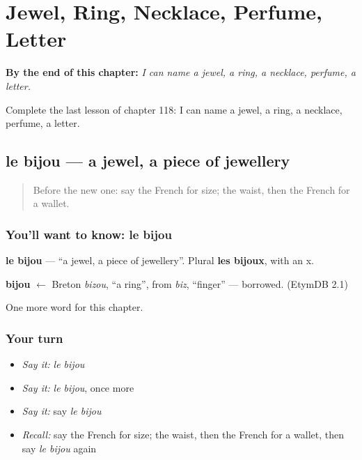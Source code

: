 
\chapter{Jewel, Ring, Necklace, Perfume, Letter}
\label{ch:fr-jewel-ring-necklace-perfume-letter}

\begin{chapteropening}
\textbf{By the end of this chapter:} \emph{I can name a jewel, a ring, a necklace, perfume, a letter.}

Complete the last lesson of chapter 118: I can name a jewel, a ring, a necklace, perfume, a letter.
\end{chapteropening}

\section[le bijou]{le bijou — a jewel, a piece of jewellery}

\label{lesson:FR-C118-bijou}



\begin{quote}
Before the new one: say the French for size; the waist, then the French for a wallet.
\end{quote}

\subsection*{You'll want to know: le bijou}
\textbf{le bijou} — \textquotedblleft{}a jewel, a piece of jewellery\textquotedblright{}. Plural \textbf{les bijoux}, with an x.

\begin{cousinweb}
\textbf{bijou} $\leftarrow$ Breton \emph{bizou}, \textquotedblleft{}a ring\textquotedblright{}, from \emph{biz}, \textquotedblleft{}finger\textquotedblright{} — borrowed. (EtymDB 2.1)
\end{cousinweb}

\begin{grammarlens}[title={What you've built}]
One more word for this chapter.
\end{grammarlens}

\subsection*{Your turn}
\begin{itemize}
\raggedright
  \item \emph{Say it:} \emph{le bijou}
  \item \emph{Say it:} \emph{le bijou}, once more
  \item \emph{Say it:} say \emph{le bijou}
  \item \emph{Recall:} say the French for size; the waist, then the French for a wallet, then say \emph{le bijou} again
\end{itemize}

